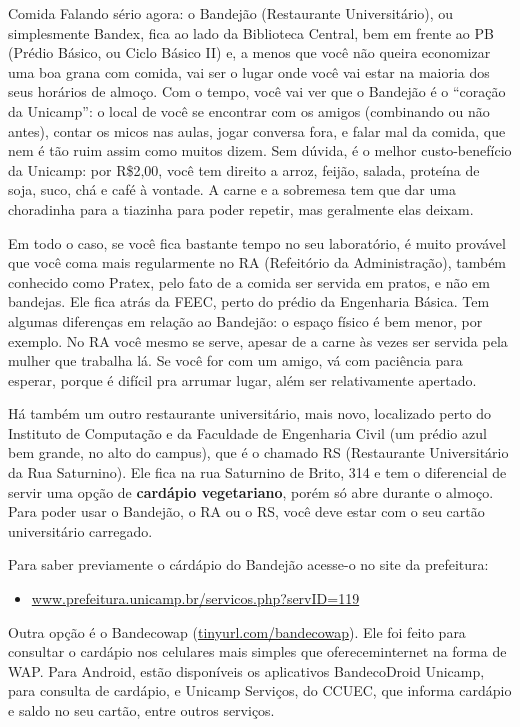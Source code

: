 \begin{story}{Comida}
Falando sério agora: o Bandejão (Restaurante Universitário), ou simplesmente Bandex, fica ao lado da Biblioteca Central, bem em frente ao PB (Prédio Básico, ou Ciclo Básico II) e, a menos que você não queira economizar uma boa grana com comida, vai ser o lugar onde você vai estar na maioria dos seus horários de almoço. Com o tempo, você vai ver que o Bandejão é o ``coração da Unicamp'': o local de você se encontrar com os amigos (combinando ou não antes), contar os micos nas aulas, jogar conversa fora, e falar mal da comida, que nem é tão ruim assim como muitos dizem. Sem dúvida, é o melhor custo-benefício da Unicamp: por R\$2,00, você tem direito a arroz, feijão, salada, proteína de soja, suco, chá e café à vontade. A carne e a sobremesa tem que dar uma choradinha para a tiazinha para poder repetir, mas geralmente elas deixam.

Em todo o caso, se você fica bastante tempo no seu laboratório, é muito provável que você coma mais regularmente no RA (Refeitório da Administração), também conhecido como Pratex, pelo fato de a comida ser servida em pratos, e não em bandejas. Ele fica atrás da FEEC, perto do prédio da Engenharia Básica. Tem algumas diferenças em relação ao Bandejão: o espaço físico é bem menor, por exemplo. No RA você mesmo se serve, apesar de a carne às vezes ser servida pela mulher que trabalha lá. Se você for com um amigo, vá com paciência para esperar, porque é difícil pra arrumar lugar, além ser relativamente apertado.

Há também um outro restaurante universitário, mais novo, localizado perto do Instituto de Computação e da Faculdade de Engenharia Civil (um prédio azul bem grande, no alto do campus), que é o chamado RS (Restaurante Universitário da Rua Saturnino). Ele fica na rua Saturnino de Brito, 314 e tem o diferencial de servir uma opção de \textbf{cardápio vegetariano}, porém só abre durante o almoço. Para poder usar o Bandejão, o RA ou o RS, você deve estar com o seu cartão universitário carregado.

Para saber previamente o cárdápio do Bandejão acesse-o no site da prefeitura:

\begin{itemize}
\item \url{www.prefeitura.unicamp.br/servicos.php?servID=119}
\end{itemize}

Outra opção é o Bandecowap (\url{tinyurl.com/bandecowap}). Ele foi feito para consultar o cardápio nos celulares mais simples que ofereceminternet na forma de WAP. Para Android, estão disponíveis os aplicativos BandecoDroid Unicamp, para consulta de cardápio, e Unicamp Serviços, do CCUEC, que informa cardápio e saldo no seu cartão, entre outros serviços.


\end{story}
